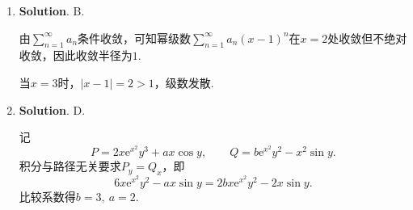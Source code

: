 \documentclass[../main.tex]{subfiles}
\begin{document}
\begin{enumerate}
          对于D选项，令$a_n=(-1)^{n-1}$，则$\lim_{n\to\infty}\frac{a_{n+1}}{a_n}=-1<1$，但$\sum a_n$发散.

    \item \textbf{Solution}. B.

          由$\sum_{n=1}^{\infty}a_n$条件收敛，可知幂级数$\sum_{n=1}^{\infty}a_n(x-1)^n$在$x=2$处收敛但不绝对收敛，因此收敛半径为$1$.

          当$x=3$时，$|x-1|=2>1$，级数发散.

    \item \textbf{Solution}. D.

          记
          \[
              P=2x\mathrm{e}^{x^2}y^3+ax\cos y,\qquad Q=b\mathrm{e}^{x^2}y^2-x^2\sin y.
          \]
          积分与路径无关要求$P_y=Q_x$，即
          \[
              6x\mathrm{e}^{x^2}y^2-ax\sin y=2b x\mathrm{e}^{x^2}y^2-2x\sin y.
          \]
          比较系数得$b=3,\ a=2$.

\end{enumerate}
\end{document}
